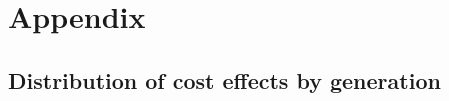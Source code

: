 \documentclass[a4paper,12pt]{article}
\theoremstyle{plain}
\theoremstyle{definition}
\begin{document}
   
   \newpage
\appendix
\section{Appendix}
\subsection{Distribution of cost effects by generation}
\end{document}
